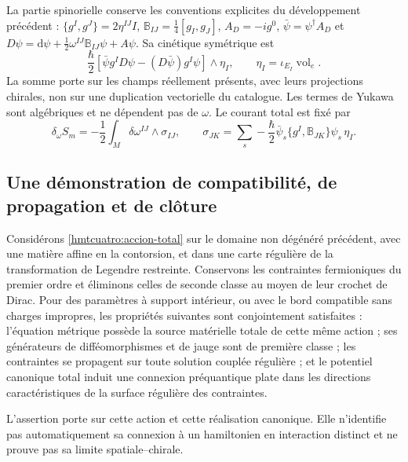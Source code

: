 La partie spinorielle conserve les conventions explicites du développement précédent : \(\{g^I,g^J\}=2\eta^{IJ}I\), \(\mathbb B_{IJ}=\frac14[g_I,g_J]\), \(A_D=-ig^0\), \(\bar\psi=\psi^\dagger A_D\) et \(D\psi=\mathrm d\psi+\frac12\omega^{IJ}\mathbb B_{IJ}\psi+A\psi\). Sa cinétique symétrique est
\[
 \frac{\hbar}{2}
 [\bar\psi g^I D\psi-(D\bar\psi)g^I\psi]\wedge\eta_I,
 \qquad \eta_I=\iota_{E_I}\operatorname{vol}_e .
\]
La somme porte sur les champs réellement présents, avec leurs projections chirales, non sur une duplication vectorielle du catalogue. Les termes de Yukawa sont algébriques et ne dépendent pas de \(\omega\). Le courant total est fixé par
\begin{equation}
 \delta_\omega S_m=-\frac12\int_M\delta\omega^{IJ}\wedge\sigma_{IJ},
 \qquad
 \sigma_{JK}=\sum_s-\frac{\hbar}{2}
   \bar\psi_s\{g^I,\mathbb B_{JK}\}\psi_s\,\eta_I.
 \label{hmtcuatro:corriente-total}
\end{equation}

\subsection{Une démonstration de compatibilité, de propagation et de clôture}
\label{hmtcuatro:demostracion-unica}

\begin{theorem}
\label{hmtcuatro:teorema-canonico-total} Considérons \eqref{hmtcuatro:accion-total} sur le domaine non dégénéré précédent, avec une matière affine en la contorsion, et dans une carte régulière de la transformation de Legendre restreinte. Conservons les contraintes fermioniques du premier ordre et éliminons celles de seconde classe au moyen de leur crochet de Dirac. Pour des paramètres à support intérieur, ou avec le bord compatible sans charges impropres, les propriétés suivantes sont conjointement satisfaites : l’équation métrique possède la source matérielle totale de cette même action ; ses générateurs de difféomorphismes et de jauge sont de première classe ; les contraintes se propagent sur toute solution couplée régulière ; et le potentiel canonique total induit une connexion préquantique plate dans les directions caractéristiques de la surface régulière des contraintes.

L’assertion porte sur cette action et cette réalisation canonique. Elle n’identifie pas automatiquement sa connexion à un hamiltonien en interaction distinct et ne prouve pas sa limite spatiale--chirale.
\end{theorem}

